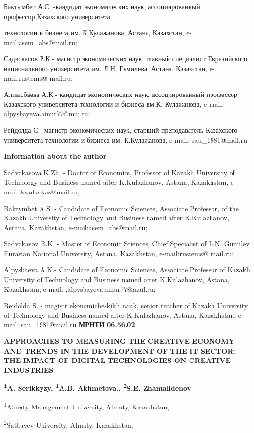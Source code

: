 Бактымбет А.С. -кандидат экономических наук, ассоциированный
профессор,Казахского университета

технологии и бизнеса им. К.Кулажанова, Астана, Казахстан,
e-mail:asem\_abs@mail.ru;

Садвокасов Р.К.- магистр экономических наук, главный специалист
Евразийского национального университета им. Л.Н. Гумилева, Астана,
Казахстан, e-mail:rustems@ mail.ru;

Алпысбаева А.К.- кандидат экономических наук, ассоциированный профессор
Казахского университета технологии и бизнеса им.К. Кулажанова, e-mail:
alpysbayeva.ainur77@mai.ru;

Рейдолда С. -магистр экономических наук, старший преподаватель
Казахского университета технологии и бизнеса им. К.Кулажанова, e-mail:
sau\_1981@mail.ru

{\bfseries Information about the author}

Sadvokasova K.Zh. - Doctor of Economics, Professor of Kazakh University
of Technology and Business named after K.Kulazhanov, Astana, Kazakhstan,
e-mail: ksadvokas@mail.ru;

Baktymbet A.S. - Candidate of Economic Sciences, Associate Professor, of
the Kazakh University of Technology and Business named after
K.Kulazhanov, Astana, Kazakhstan, e-mail:asem\_abs@mail.ru;

Sadvokasov R.K. - Master of Economic Sciences, Chief Specialist of L.N.
Gumilev Eurasian National University, Astana, Kazakhstan,
e-mail:rustems@ mail.ru;

Alpysbaeva A.K.- Candidate of Economic Sciences, Associate Professor of
Kazakh University of Technology and Business named after K.Kulazhanov,
Astana, Kazakhstan, e-mail: ,alpysbayeva.ainur77@mail.ru;

Reidolda S. - magistr ekonomicheskikh nauk, senior teacher of Kazakh
University of Technology and Business named after K.Kulazhanov, Astana,
Kazakhstan, e-mail: sau\_1981@mail.ru\newpage
{\bfseries МРНТИ 06.56.02}

{\bfseries APPROACHES TO MEASURING THE CREATIVE ECONOMY AND TRENDS IN THE
DEVELOPMENT OF THE IT SECTOR: THE IMPACT OF DIGITAL TECHNOLOGIES ON
CREATIVE INDUSTRIES}

{\bfseries \textsuperscript{1}A. Serikkyzy, \textsuperscript{1}A.B.
Akhmetova., \textsuperscript{2}S.E. Zhamalidenov}

\textsuperscript{1}Almaty Management University, Almaty, Kazakhstan,

\textsuperscript{2}Satbayev University, Almaty, Kazakhstan,

